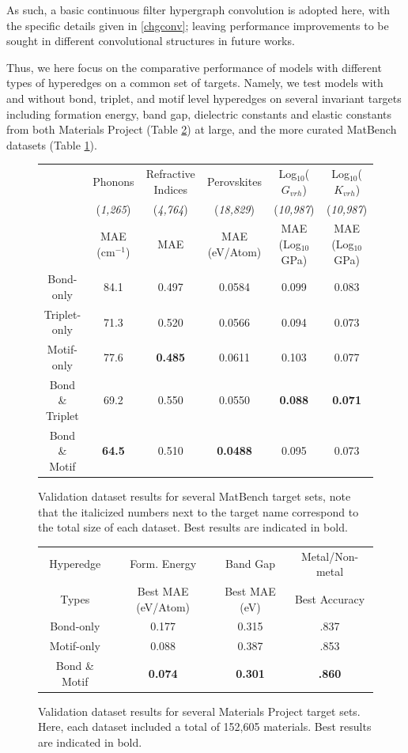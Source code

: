 \documentclass[10pt,a4paper]{article}
\begin{document}
As such, a basic continuous filter hypergraph convolution is adopted here, with the specific details given in \ref{chgconv}; leaving performance improvements to be sought in different convolutional structures in future works. 

Thus, we here focus on the comparative performance of models with different types of hyperedges on a common set of targets. Namely, we test models with and without bond, triplet, and motif level hyperedges on several invariant targets including formation energy, band gap, dielectric constants and elastic constants from both Materials Project (Table \ref{fig:mp_table}) at large, and the more curated MatBench datasets (Table \ref{fig:matbench_table}).


 
\begin{figure}\label{fig:matbench_table}\small
\begin{tabular}{c|ccccc}
 & Phonons  & Refractive Indices& Perovskites  & Log$_{10}$($G_{vrh}$) & Log$_{10}$($K_{vrh}$) \\
 & (\textit{1,265}) &  (\textit{4,764}) & (\textit{18,829}) & (\textit{10,987}) & (\textit{10,987}) \\
 & MAE (cm$^{-1}$) & MAE & MAE (eV/Atom)& MAE (Log$_{10}$GPa)& MAE (Log$_{10}$GPa)  \\
\hline
Bond-only & 84.1& 0.497 & 0.0584 & 0.099 & 0.083\\
Triplet-only & 71.3& 0.520 & 0.0566 & 0.094 & 0.073 \\
Motif-only & 77.6& \textbf{0.485} & 0.0611 & 0.103 & 0.077\\
Bond \& Triplet & 69.2& 0.550 & 0.0550 & \textbf{0.088}& \textbf{0.071} \\
Bond \& Motif & \textbf{64.5}& 0.510 & \textbf{0.0488}&0.095 & 0.073\\
\end{tabular}
\caption{Validation dataset results for several MatBench target sets, note that the italicized numbers next to the target name correspond to the total size of each dataset. Best results are indicated in bold.}
\end{figure}

\begin{figure}\label{fig:mp_table}
\begin{tabular}{c|ccc}
Hyperedge & Form. Energy & Band Gap & Metal/Non-metal \\
Types & Best MAE (eV/Atom) & Best MAE (eV) & Best Accuracy \\
\hline
Bond-only & 0.177 & 0.315 & .837 \\
Motif-only &  0.088 & 0.387 & .853\\
Bond \& Motif &  \textbf{0.074} & \textbf{0.301 } & \textbf{.860}\\
\end{tabular}
\caption{Validation dataset results for several Materials Project target sets. Here, each dataset included a total of 152,605 materials. Best results are indicated in bold.}
\end{figure}
\end{document}
